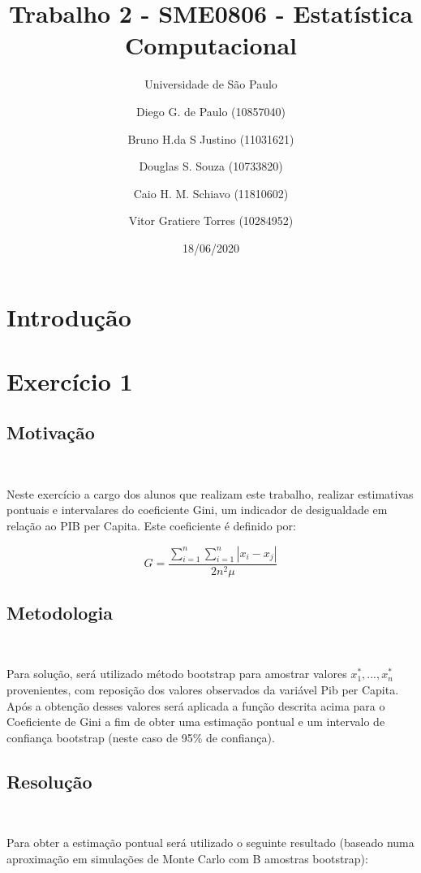 \documentclass[11pt,]{article}
\title{Trabalho 2 - SME0806 - Estatística Computacional}
\subtitle{Universidade de São Paulo}
\author{Diego G. de Paulo (10857040) \and Bruno H.da S Justino (11031621) \and Douglas S. Souza (10733820) \and Caio H. M. Schiavo (11810602) \and Vitor Gratiere Torres (10284952)}
\date{18/06/2020}
\begin{document}
\maketitle

\newpage
\tableofcontents
\newpage

\hypertarget{introduuxe7uxe3o}{%
\section{Introdução}\label{introduuxe7uxe3o}}

\hypertarget{exercuxedcio-1}{%
\section{Exercício 1}\label{exercuxedcio-1}}

\hypertarget{motivauxe7uxe3o}{%
\subsection{Motivação}\label{motivauxe7uxe3o}}

~

Neste exercício a cargo dos alunos que realizam este trabalho, realizar
estimativas pontuais e intervalares do coeficiente Gini, um indicador de
desigualdade em relação ao PIB per Capita. Este coeficiente é definido
por:

\[G = \frac{\sum_{i=1}^n\sum_{i=1}^n |x_i-x_j|}{2n^2\mu}\]

\hypertarget{metodologia}{%
\subsection{Metodologia}\label{metodologia}}

~

Para solução, será utilizado método bootstrap para amostrar valores
\(x_1^*, ..., x_n^*\) provenientes, com reposição dos valores observados
da variável Pib per Capita. Após a obtenção desses valores será aplicada
a função descrita acima para o Coeficiente de Gini a fim de obter uma
estimação pontual e um intervalo de confiança bootstrap (neste caso de
95\% de confiança).

\hypertarget{resoluuxe7uxe3o}{%
\subsection{Resolução}\label{resoluuxe7uxe3o}}

~

Para obter a estimação pontual será utilizado o seguinte resultado
(baseado numa aproximação em simulações de Monte Carlo com B amostras
bootstrap):
\end{document}
